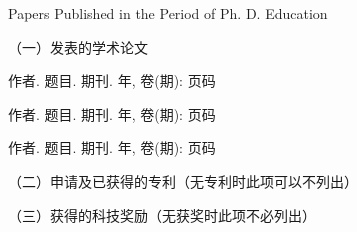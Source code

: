 
{} {Papers
Published in the Period of Ph. D. Education}

（一）发表的学术论文
\begin{publist}
\item 作者. 题目. 期刊. 年, 卷(期): 页码

\item 作者. 题目. 期刊. 年, 卷(期): 页码

\item 作者. 题目. 期刊. 年, 卷(期): 页码
\end{publist}

（二）申请及已获得的专利（无专利时此项可以不列出）


（三）获得的科技奖励（无获奖时此项不必列出）






